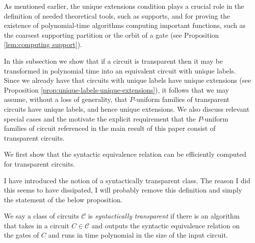 \documentclass[../paper.tex]{subfiles}
\begin{document}
As mentioned earlier, the unique extensions condition plays a crucial role in
the definition of needed theoretical tools, such as supports, and for proving
the existence of polynomial-time algorithms computing important functions, such
as the coarsest supporting partition or the orbit of a gate (see Proposition
\ref{lem:computing support}).

In this subsection we show that if a circuit is transparent then it may be
transformed in polynomial time into an equivalent circuit with unique labels.
Since we already have that circuits with unique labels have unique extensions
(see Proposition \ref{prop:unique-labels-unique-extensions}), it follows that we
may assume, without a loss of generality, that $P$-uniform families of
transparent circuits have unique labels, and hence unique extensions. We also
discuss relevant special cases and the motivate the explicit requirement that
the $P$-uniform families of circuit referenced in the main result of this paper
consist of transparent circuits.



We first show that the syntactic equivalence relation can be efficiently
computed for transparent circuits.

\begin{remark}
  I have introduced the notion of a syntactically transparent class. The reason
  I did this seems to have dissipated, I will probably remove this definition
  and simply the statement of the below proposition.
\end{remark}

\begin{definition}
  We say a class of circuits $\mathcal{C}$ is \emph{syntactically transparent}
  if there is an algorithm that takes in a circuit $C \in \mathcal{C}$ and
  outputs the syntactic equivalence relation on the gates of $C$ and runs in
  time polynomial in the size of the input circuit.
\end{definition}
\end{document}
